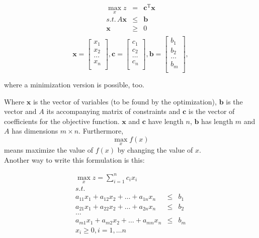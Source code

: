 \begin{eqnarray*}
\max_{x} z & = & \mathbf{c}^{\mathrm{T}}\mathbf{x} \\
s.t.\, A\mathbf{x} & \leqslant & \mathbf{b} \\
\mathbf{x} & \geqslant & 0 \\
\end{eqnarray*}
\[
\mathbf{x} =
\begin{bmatrix}
x_1 \\
x_2 \\
\ldots \\
x_n \\
\end{bmatrix},
\mathbf{c} = 
\begin{bmatrix}
c_1 \\
c_2 \\
\ldots \\
c_n \\
\end{bmatrix},
\mathbf{b} =
\begin{bmatrix}
b_1 \\
b_2 \\
\ldots \\
b_m \\
\end{bmatrix},
\]

where a minimization version is possible, too.

Where $\mathbf{x}$ is the vector of variables (to be found by the optimization), $\mathbf{b}$ is the vector and $A$ its accompanying matrix of constraints and $\mathbf{c}$ is the vector of coefficients for the objective function. $\mathbf{x}$ and $\mathbf{c}$ have length $n$, $\mathbf{b}$ has length $m$ and $A$ has dimensions $m \times n$. Furthermore, \[\max_{x} f(x)\] means maximize the value of $f(x)$ by changing the value of $x$.\\

Another way to write this formulation is this:

\begin{eqnarray*}
\max_{x} z = \sum_{i=1}^{n} c_i x_i \\
s.t. & \\
	   a_{11}x_{1} + a_{12}x_{2} + \ldots + a_{1n}x_{n} & \leqslant & b_{1} \\
	   a_{21}x_{1} + a_{22}x_{2} + \ldots + a_{2n}x_{n} & \leqslant & b_{2} \\
	   \ldots \\
	   a_{m1}x_{1} + a_{m2}x_{2} + \ldots + a_{mn}x_{n} & \leqslant & b_{m} \\
	   x_i \geqslant 0, i = 1, \ldots n \\
\end{eqnarray*}

